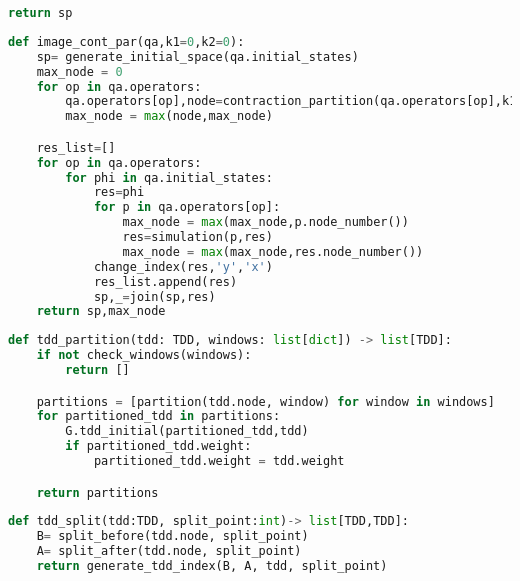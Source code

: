 {\begin{lstlisting}[language=Python, caption=对量子电路应用addition优化方案]
    return sp
\end{lstlisting}
\begin{lstlisting}[language=Python, caption=对量子电路应用contraction优化方案]
def image_cont_par(qa,k1=0,k2=0):
    sp= generate_initial_space(qa.initial_states)
    max_node = 0
    for op in qa.operators:
        qa.operators[op],node=contraction_partition(qa.operators[op],k1,k2)
        max_node = max(node,max_node)

    res_list=[]
    for op in qa.operators:
        for phi in qa.initial_states:
            res=phi
            for p in qa.operators[op]:
                max_node = max(max_node,p.node_number())
                res=simulation(p,res)
                max_node = max(max_node,res.node_number())
            change_index(res,'y','x')
            res_list.append(res)
            sp,_=join(sp,res)
    return sp,max_node
\end{lstlisting}
\begin{lstlisting}[language=Python, caption=对TDD运用窗函数划分]
def tdd_partition(tdd: TDD, windows: list[dict]) -> list[TDD]:
    if not check_windows(windows):
        return []

    partitions = [partition(tdd.node, window) for window in windows]
    for partitioned_tdd in partitions:
        G.tdd_initial(partitioned_tdd,tdd)
        if partitioned_tdd.weight:
            partitioned_tdd.weight = tdd.weight

    return partitions
\end{lstlisting}
\begin{lstlisting}[language=Python, caption=对TDD进行分割]
def tdd_split(tdd:TDD, split_point:int)-> list[TDD,TDD]:
    B= split_before(tdd.node, split_point)
    A= split_after(tdd.node, split_point)
    return generate_tdd_index(B, A, tdd, split_point)
\end{lstlisting}
\thispagestyle{appendixheader}
}